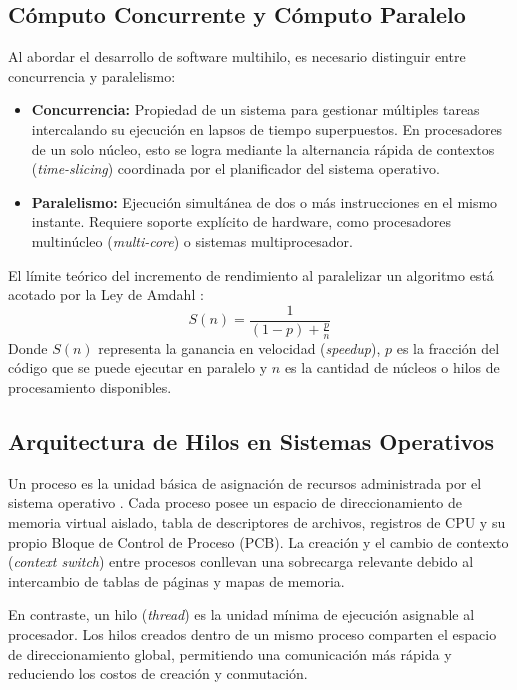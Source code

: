 \subsection{Cómputo Concurrente y Cómputo Paralelo}
Al abordar el desarrollo de software multihilo, es necesario distinguir entre concurrencia y paralelismo:
\begin{itemize}
    \item \textbf{Concurrencia:} Propiedad de un sistema para gestionar múltiples tareas intercalando su ejecución en lapsos de tiempo superpuestos. En procesadores de un solo núcleo, esto se logra mediante la alternancia rápida de contextos (\textit{time-slicing}) coordinada por el planificador del sistema operativo.
    \item \textbf{Paralelismo:} Ejecución simultánea de dos o más instrucciones en el mismo instante. Requiere soporte explícito de hardware, como procesadores multinúcleo (\textit{multi-core}) o sistemas multiprocesador.
\end{itemize}

El límite teórico del incremento de rendimiento al paralelizar un algoritmo está acotado por la Ley de Amdahl \cite{amdahl:ley:1967}:
\[
S(n) = \frac{1}{(1 - p) + \frac{p}{n}}
\]
Donde \(S(n)\) representa la ganancia en velocidad (\textit{speedup}), \(p\) es la fracción del código que se puede ejecutar en paralelo y \(n\) es la cantidad de núcleos o hilos de procesamiento disponibles.

\subsection{Arquitectura de Hilos en Sistemas Operativos}
Un proceso es la unidad básica de asignación de recursos administrada por el sistema operativo \cite{silberschatz:os-concepts:2018}. Cada proceso posee un espacio de direccionamiento de memoria virtual aislado, tabla de descriptores de archivos, registros de CPU y su propio Bloque de Control de Proceso (PCB). La creación y el cambio de contexto (\textit{context switch}) entre procesos conllevan una sobrecarga relevante debido al intercambio de tablas de páginas y mapas de memoria.

En contraste, un hilo (\textit{thread}) es la unidad mínima de ejecución asignable al procesador. Los hilos creados dentro de un mismo proceso comparten el espacio de direccionamiento global, permitiendo una comunicación más rápida y reduciendo los costos de creación y conmutación.

